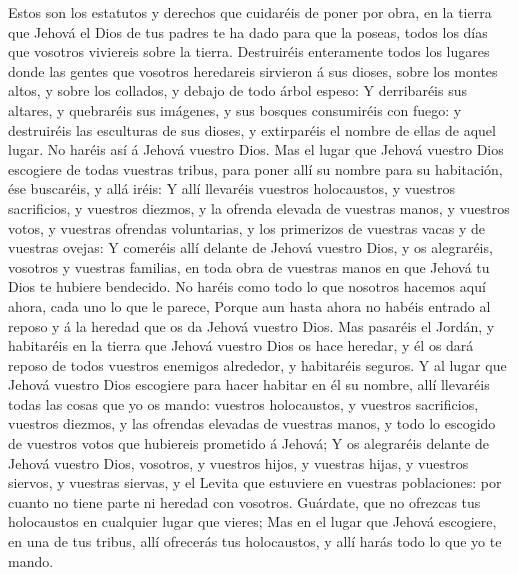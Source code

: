  Estos son los estatutos y derechos que cuidaréis de poner
por obra, en la tierra que Jehová el Dios de tus padres te ha dado para
que la poseas, todos los días que vosotros viviereis sobre la tierra.
 Destruiréis enteramente todos los lugares donde las gentes
que vosotros heredareis sirvieron á sus dioses, sobre los montes altos,
y sobre los collados, y debajo de todo árbol espeso:  Y
derribaréis sus altares, y quebraréis sus imágenes, y sus bosques
consumiréis con fuego: y destruiréis las esculturas de sus dioses, y
extirparéis el nombre de ellas de aquel lugar.  No haréis
así á Jehová vuestro Dios.  Mas el lugar que Jehová vuestro
Dios escogiere de todas vuestras tribus, para poner allí su nombre para
su habitación, ése buscaréis, y allá iréis:  Y allí
llevaréis vuestros holocaustos, y vuestros sacrificios, y vuestros
diezmos, y la ofrenda elevada de vuestras manos, y vuestros votos, y
vuestras ofrendas voluntarias, y los primerizos de vuestras vacas y de
vuestras ovejas:  Y comeréis allí delante de Jehová vuestro
Dios, y os alegraréis, vosotros y vuestras familias, en toda obra de
vuestras manos en que Jehová tu Dios te hubiere bendecido. 
No haréis como todo lo que nosotros hacemos aquí ahora, cada uno lo que
le parece,  Porque aun hasta ahora no habéis entrado al
reposo y á la heredad que os da Jehová vuestro Dios.  Mas
pasaréis el Jordán, y habitaréis en la tierra que Jehová vuestro Dios os
hace heredar, y él os dará reposo de todos vuestros enemigos alrededor,
y habitaréis seguros.  Y al lugar que Jehová vuestro Dios
escogiere para hacer habitar en él su nombre, allí llevaréis todas las
cosas que yo os mando: vuestros holocaustos, y vuestros sacrificios,
vuestros diezmos, y las ofrendas elevadas de vuestras manos, y todo lo
escogido de vuestros votos que hubiereis prometido á Jehová;
 Y os alegraréis delante de Jehová vuestro Dios, vosotros,
y vuestros hijos, y vuestras hijas, y vuestros siervos, y vuestras
siervas, y el Levita que estuviere en vuestras poblaciones: por cuanto
no tiene parte ni heredad con vosotros.  Guárdate, que no
ofrezcas tus holocaustos en cualquier lugar que vieres; 
Mas en el lugar que Jehová escogiere, en una de tus tribus, allí
ofrecerás tus holocaustos, y allí harás todo lo que yo te mando.

